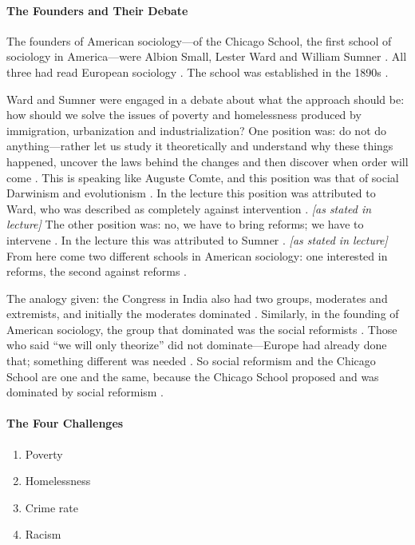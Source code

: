 \paragraph{The Founders and Their Debate}
The founders of American sociology---of the Chicago School, the first school of sociology in America---were Albion Small, Lester Ward and William Sumner . All three had read European sociology . The school was established in the 1890s .

\begin{CriticalPoint}
Ward and Sumner were engaged in a debate about what the approach should be: how should we solve the issues of poverty and homelessness produced by immigration, urbanization and industrialization? 
One position was: do not do anything---rather let us study it theoretically and understand why these things happened, uncover the laws behind the changes and then discover when order will come . This is speaking like Auguste Comte, and this position was that of social Darwinism and evolutionism . In the lecture this position was attributed to Ward, who was described as completely against intervention . \textit{[as stated in lecture]}
The other position was: no, we have to bring reforms; we have to intervene . In the lecture this was attributed to Sumner . \textit{[as stated in lecture]}
From here come two different schools in American sociology: one interested in reforms, the second against reforms .
\end{CriticalPoint}

The analogy given: the Congress in India also had two groups, moderates and extremists, and initially the moderates dominated . Similarly, in the founding of American sociology, the group that dominated was the social reformists . Those who said ``we will only theorize'' did not dominate---Europe had already done that; something different was needed .
So social reformism and the Chicago School are one and the same, because the Chicago School proposed and was dominated by social reformism .

\paragraph{The Four Challenges}
\begin{enumerate}
    \item Poverty 
    \item Homelessness 
    \item Crime rate 
    \item Racism 
\end{enumerate}

